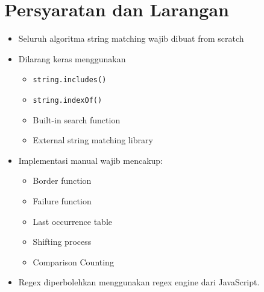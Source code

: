 \section{Persyaratan dan Larangan}
\begin{itemize}
    \item Seluruh algoritma string matching wajib dibuat from scratch
    \item Dilarang keras menggunakan
          \begin{itemize}
              \item \texttt{string.includes()}
              \item \texttt{string.indexOf()}
              \item Built-in search function
              \item External string matching library
          \end{itemize}
    \item Implementasi manual wajib mencakup:
          \begin{itemize}
              \item Border function
              \item Failure function
              \item Last occurrence table
              \item Shifting process
              \item Comparison Counting

          \end{itemize}
    \item Regex diperbolehkan menggunakan regex engine dari JavaScript.
\end{itemize}

